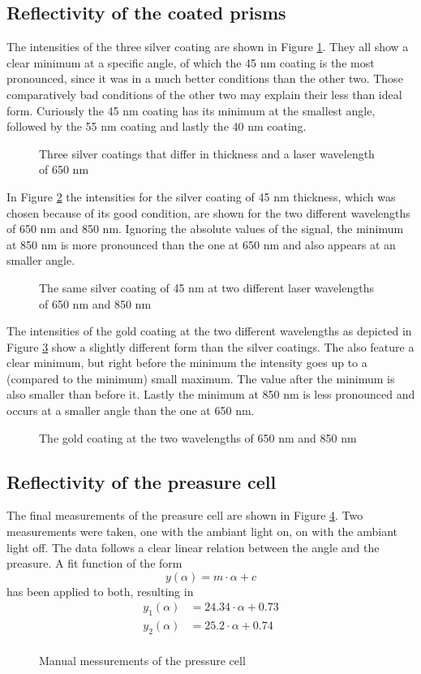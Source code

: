 \documentclass[twoside,english,headsepline=on,DIV=12]{scrartcl}
\numberwithin{equation}{section}
\begin{document}
\subsection{Reflectivity of the coated prisms}
The intensities of the three silver coating are shown in Figure \ref{fig:Ag}. They all show a clear minimum at a specific angle, of which the 45 nm coating is the most pronounced, since it was in a much better conditions than the other two. Those comparatively bad conditions of the other two may explain their less than ideal form. Curiously the 45 nm coating has its minimum at the smallest angle, followed by the 55 nm coating and lastly the 40 nm coating. 
\begin{figure}
	
	\caption{Three silver coatings that differ in thickness and a laser wavelength of 650 nm}
	\label{fig:Ag}
\end{figure}
In Figure \ref{fig:Ag2} the intensities for the silver coating of 45 nm thickness, which was chosen because of its good condition, are shown for the two different wavelengths of 650 nm and 850 nm. Ignoring the absolute values of the signal, the minimum at 850 nm is more pronounced than the one at 650 nm and also appears at an smaller angle. 
\begin{figure}
	
	\caption{The same silver coating of 45 nm at two different laser wavelengths of 650 nm and 850 nm}
	\label{fig:Ag2}
\end{figure}
The intensities of the gold coating at the two different wavelengths as depicted in Figure \ref{fig:Au} show a slightly different form than the silver coatings. The also feature a clear minimum, but right before the minimum the intensity goes up to a (compared to the minimum) small maximum. The value after the minimum is also smaller than before it. Lastly the minimum at 850 nm is less pronounced and occurs at a smaller angle than the one at 650 nm.
\begin{figure}
	
	\caption{The gold coating at the two wavelengths of 650 nm and 850 nm}
	\label{fig:Au}
\end{figure}
\subsection{Reflectivity of the preasure cell}
The final measurements of the preasure cell are shown in Figure \ref{fig:preasure}. Two measurements were taken, one with the ambiant light on, on with the ambiant light off. The data follows a clear linear relation between the angle and the preasure. A fit function of the form
\[
y(\alpha) = m\cdot\alpha + c
\]
has been applied to both, resulting in 
\begin{align*}
y_1(\alpha) &= 24.34\cdot\alpha + 0.73 \\
y_2(\alpha) &= 25.2 \cdot\alpha + 0.74 \\
\end{align*}
\begin{figure}
	
	\caption{Manual messurements of the pressure cell}
	\label{fig:preasure}
\end{figure}
\printbibliography
\end{document}
